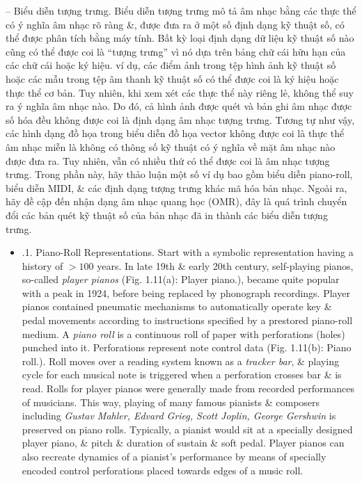 \documentclass{article}
\begin{document}
\begin{itemize}
\begin{itemize}
		-- {\sf Biểu diễn tượng trưng.} Biểu diễn tượng trưng mô tả âm nhạc bằng các thực thể có ý nghĩa âm nhạc rõ ràng \&, được đưa ra ở một số định dạng kỹ thuật số, có thể được phân tích bằng máy tính. Bất kỳ loại định dạng dữ liệu kỹ thuật số nào cũng có thể được coi là ``tượng trưng'' vì nó dựa trên bảng chữ cái hữu hạn của các chữ cái hoặc ký hiệu. ví dụ, các điểm ảnh trong tệp hình ảnh kỹ thuật số hoặc các mẫu trong tệp âm thanh kỹ thuật số có thể được coi là ký hiệu hoặc thực thể cơ bản. Tuy nhiên, khi xem xét các thực thể này riêng lẻ, không thể suy ra ý nghĩa âm nhạc nào. Do đó, cả hình ảnh được quét và bản ghi âm nhạc được số hóa đều không được coi là định dạng âm nhạc tượng trưng. Tương tự như vậy, các hình dạng đồ họa trong biểu diễn đồ họa vector không được coi là thực thể âm nhạc miễn là không có thông số kỹ thuật có ý nghĩa về mặt âm nhạc nào được đưa ra. Tuy nhiên, vẫn có nhiều thứ có thể được coi là âm nhạc tượng trưng. Trong phần này, hãy thảo luận một số ví dụ bao gồm biểu diễn piano-roll, biểu diễn MIDI, \& các định dạng tượng trưng khác mã hóa bản nhạc. Ngoài ra, hãy đề cập đến nhận dạng âm nhạc quang học (OMR), đây là quá trình chuyển đổi các bản quét kỹ thuật số của bản nhạc đã in thành các biểu diễn tượng trưng.
		\begin{itemize}
			\item {.1. Piano-Roll Representations.} Start with a symbolic representation having a history of $> 100$ years. In late 19th \& early 20th century, self-playing pianos, so-called {\it player pianos} ({\sf Fig. 1.11(a): Player piano.}), became quite popular with a peak in 1924, before being replaced by phonograph recordings. Player pianos contained pneumatic mechanisms to automatically operate key \& pedal movements according to  instructions specified by a prestored piano-roll medium. A {\it piano roll} is a continuous roll of paper with perforations (holes) punched into it. Perforations represent note control data ({\sf Fig. 1.11(b): Piano roll.}). Roll moves over a reading system known as a {\it tracker bar}, \& playing cycle for each musical note is triggered when a perforation crosses bar \& is read. Rolls for player pianos were generally made from recorded performances of musicians. This way, playing of many famous pianists \& composers including {\it Gustav Mahler, Edvard Grieg, Scott Joplin, George Gershwin} is preserved on piano rolls. Typically, a pianist would sit at a specially designed player piano, \& pitch \& duration of sustain \& soft pedal. Player pianos can also recreate dynamics of a pianist's performance by means of specially encoded control perforations placed towards edges of a music roll.
			

\end{itemize}
\end{itemize}
\end{itemize}
\end{document}
